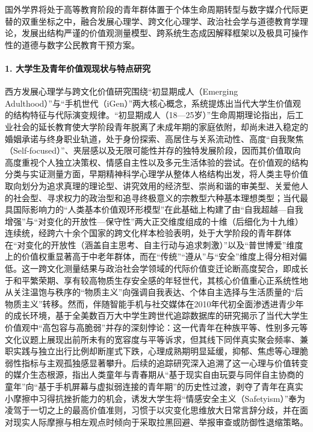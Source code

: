 国外学界将处于高等教育阶段的青年群体置于个体生命周期转型与数字媒介代际更替的双重坐标之中，融合发展心理学、跨文化心理学、政治社会学与道德教育学理论，发展出结构严谨的价值观测量模型、跨系统生态成因解释框架以及极具可操作性的道德与数字公民教育干预方案。

\paragraph{1. 大学生及青年价值观现状与特点研究}
西方发展心理学与跨文化价值研究围绕“初显期成人（Emerging Adulthood）”与“手机世代（iGen）”两大核心概念，系统提炼出当代大学生价值观的结构特征与代际演变规律。“初显期成人（18—25岁）”生命周期理论指出，后工业社会的延长教育使大学阶段青年脱离了未成年期的家庭依附，却尚未进入稳定的婚姻承诺与终身职业轨道，处于身份探索、高居住与关系流动性、高度“自我聚焦（Self-focused）”、夹层感以及无限可能性并存的独特发展阶段，因而其价值取向高度重视个人独立决策权、情感自主性以及多元生活体验的尝试\cite{Arnett2000,Arnett2023}。在价值观的结构分类与实证测量方面，早期精神科学心理学从整体人格结构出发，将人类主导价值取向划分为追求真理的理论型、讲究效用的经济型、崇尚和谐的审美型、关爱他人的社会型、寻求权力的政治型和追寻终极意义的宗教型六种基本理想类型\cite{Spranger2017}；当代最具国际影响力的“人类基本价值观环形模型”在此基础上构建了由“自我超越—自我增强”与“对变化的开放性—保守性”两大正交维度组成的十维（后细化为十九维）连续统，经跨六十余个国家的跨文化样本检验表明，处于大学阶段的青年群体在“对变化的开放性（涵盖自主思考、自主行动与追求刺激）”以及“普世博爱”维度上的价值权重显著高于中老年群体，而在“传统”“遵从”与“安全”维度上得分相对偏低\cite{Schwartz1992,Schwartz2012}。这一跨文化测量结果与政治社会学领域的代际价值变迁论断高度契合，即成长于和平繁荣期、享有较高物质生存安全感的年轻世代，其核心价值重心正系统性地从关注温饱与秩序的“物质主义”向强调自我表达、个体自主选择与生活质量的“后物质主义”转移\cite{Inglehart2018}。然而，伴随智能手机与社交媒体在2010年代初全面渗透进青少年的成长环境，基于全美数百万大中学生跨世代追踪数据库的研究揭示了当代大学生价值观中“高包容与高脆弱”并存的深刻悖论：这一代青年在种族平等、性别多元等文化议题上展现出前所未有的宽容度与平等诉求，但其线下同伴真实聚会频率、兼职实践与独立出行比例却断崖式下跌，心理成熟期明显延缓，抑郁、焦虑等心理脆弱性指标与主观孤独感显著攀升\cite{Twenge2017}。后续的追踪研究深入追溯了这一心理与价值转变的媒介生态根源，指出人类童年与青春期从“基于现实自由玩耍与同伴自主协商的童年”向“基于手机屏幕与虚拟弱连接的青年期”的历史性过渡，剥夺了青年在真实小摩擦中习得抗挫折能力的机会，诱发大学生将“情感安全主义（Safetyism）”奉为凌驾于一切之上的最高价值准则，习惯于以灾变化思维放大日常言辞分歧，并在面对现实人际摩擦与相左观点时倾向于采取拉黑回避、举报审查或防御性退缩策略\cite{Lukianoff2018,Haidt2024}。

